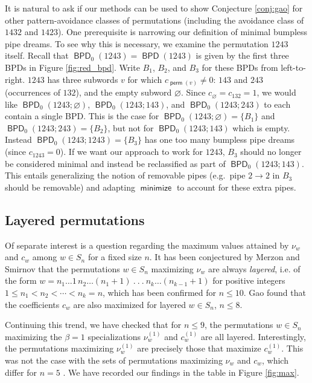 \documentclass[11pt]{article}
\theoremstyle{definition}
\providecommand{\eg}{e.g.\ }
\numberwithin{equation}{section}
\DeclareMathOperator{\perm}{\mathsf{perm}}
\DeclareMathOperator{\minimize}{\mathsf{minimize}}
\DeclareMathOperator{\BPD}{\mathsf{BPD}}
\begin{document}
It is natural to ask if our methods can be used to show Conjecture \ref{conj:gao} for other pattern-avoidance classes of permutations (including the avoidance class of $1432$ and $1423$).
One prerequisite is narrowing our definition of minimal bumpless pipe dreams.
To see why this is necessary, we examine the permutation $1243$ itself.
Recall that $\BPD_0(1243) = \BPD(1243)$ is given by the first three BPDs in Figure \ref{fig:red_bpd}.
Write $B_1$, $B_2$, and $B_3$ for these BPDs from left-to-right.
$1243$ has three subwords $v$ for which $c_{\perm(v)}\neq 0$: $143$ and $243$ (occurrences of $132$), and the empty subword $\varnothing$.
Since $c_\varnothing = c_{132} = 1$, we would like $\BPD_0(1243;\varnothing)$, $\BPD_0(1243;143)$, and $\BPD_0(1243;243)$ to each contain a single BPD.
This is the case for $\BPD_0(1243;\varnothing) = \{B_1\}$ and $\BPD_0(1243;243) = \{B_2\}$, but not for $\BPD_0(1243;143)$ which is empty.
Instead $\BPD_0(1243;1243) = \{B_3\}$ has one too many bumpless pipe dreams (since $c_{1243} = 0$).
If we want our approach to work for $1243$, $B_3$ should no longer be considered minimal and instead be reclassified as part of $\BPD_0(1243;143)$.
This entails generalizing the notion of removable pipes (\eg pipe $2\to 2$ in $B_3$ should be removable) and adapting $\minimize$ to account for these extra pipes.



\subsection{Layered permutations}

Of separate interest is a question regarding the maximum values attained by $\nu_w$ and $c_w$ among $w\in S_n$ for a fixed size $n$.
It has been conjectured by Merzon and Smirnov \cite{MS16} that the permutations $w\in S_n$ maximizing $\nu_w$ are always \textit{layered}, i.e. of the form $w = n_1 \dots 1\,
    n_2\dots (n_1+1)
    \ .\ .\ .\ 
    n_k\dots (n_{k-1}+1)
$ for positive integers $1\leq n_1< n_2< \cdots< n_k=n$, which has been confirmed for $n\leq 10$.
Gao \cite{Gao21} found that the coefficients $c_w$ are also maximized for layered $w\in S_n$, $n\leq 8$.

Continuing this trend, we have checked that for $n\leq 9$, the permutations $w\in S_n$ maximizing the $\beta=1$ specializations $\nu^{(1)}_w$ and $c^{(1)}_w$ are all layered.
Interestingly, the permutations maximizing $\nu^{(1)}_w$ are precisely those that maximize $c^{(1)}_w$.
This was not the case with the sets of permutations maximizing $\nu_w$ and $c_w$, which differ for $n=5$ \cite{Sta17,Gao21}.
We have recorded our findings in the table in Figure \ref{fig:max}.
\end{document}
